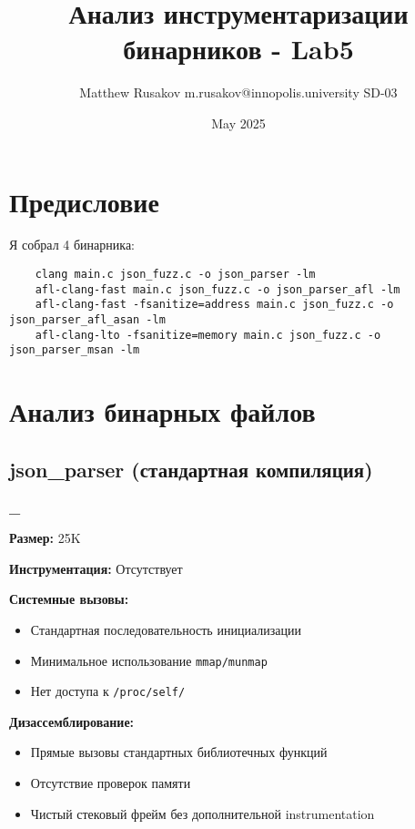 \usepackage[utf8]{inputenc}
\usepackage[T2]{fontenc}
\usepackage{graphicx}
\usepackage{hyperref}
\usepackage{listings}
\usepackage{xcolor}
\usepackage[russian]{babel}
\usepackage{geometry}

\title{Анализ инструментаризации бинарников - Lab5}
\author{Matthew Rusakov m.rusakov@innopolis.university SD-03}
\date{May 2025}



\maketitle

\section*{Предисловие}

Я собрал 4 бинарника:

\begin{verbatim}
    clang main.c json_fuzz.c -o json_parser -lm
    afl-clang-fast main.c json_fuzz.c -o json_parser_afl -lm
    afl-clang-fast -fsanitize=address main.c json_fuzz.c -o json_parser_afl_asan -lm
    afl-clang-lto -fsanitize=memory main.c json_fuzz.c -o json_parser_msan -lm
\end{verbatim}

\section{Анализ бинарных файлов}

\subsection{json\_parser (стандартная компиляция)}
\textbf{\_}

\textbf{Размер:} 25K

\textbf{Инструментация:} Отсутствует

\textbf{Системные вызовы:}
  \begin{itemize}
  \item Стандартная последовательность инициализации
  \item Минимальное использование \texttt{mmap/munmap}
  \item Нет доступа к \texttt{/proc/self/}
  \end{itemize}

\textbf{Дизассемблирование:}
  \begin{itemize}
  \item Прямые вызовы стандартных библиотечных функций
  \item Отсутствие проверок памяти
  \item Чистый стековый фрейм без дополнительной instrumentation
  \end{itemize}

